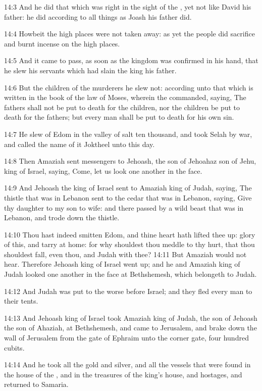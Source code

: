 14:3 And he did that which was right in the sight of the \LORD, yet not like David his father: he did according to all things as Joash his father did.

14:4 Howbeit the high places were not taken away: as yet the people did sacrifice and burnt incense on the high places.

14:5 And it came to pass, as soon as the kingdom was confirmed in his hand, that he slew his servants which had slain the king his father.

14:6 But the children of the murderers he slew not: according unto that which is written in the book of the law of Moses, wherein the \LORD commanded, saying, The fathers shall not be put to death for the children, nor the children be put to death for the fathers; but every man shall be put to death for his own sin.

14:7 He slew of Edom in the valley of salt ten thousand, and took Selah by war, and called the name of it Joktheel unto this day.

14:8 Then Amaziah sent messengers to Jehoash, the son of Jehoahaz son of Jehu, king of Israel, saying, Come, let us look one another in the face.

14:9 And Jehoash the king of Israel sent to Amaziah king of Judah, saying, The thistle that was in Lebanon sent to the cedar that was in Lebanon, saying, Give thy daughter to my son to wife: and there passed by a wild beast that was in Lebanon, and trode down the thistle.

14:10 Thou hast indeed smitten Edom, and thine heart hath lifted thee up: glory of this, and tarry at home: for why shouldest thou meddle to thy hurt, that thou shouldest fall, even thou, and Judah with thee?  14:11 But Amaziah would not hear. Therefore Jehoash king of Israel went up; and he and Amaziah king of Judah looked one another in the face at Bethshemesh, which belongeth to Judah.

14:12 And Judah was put to the worse before Israel; and they fled every man to their tents.

14:13 And Jehoash king of Israel took Amaziah king of Judah, the son of Jehoash the son of Ahaziah, at Bethshemesh, and came to Jerusalem, and brake down the wall of Jerusalem from the gate of Ephraim unto the corner gate, four hundred cubits.

14:14 And he took all the gold and silver, and all the vessels that were found in the house of the \LORD, and in the treasures of the king's house, and hostages, and returned to Samaria.

